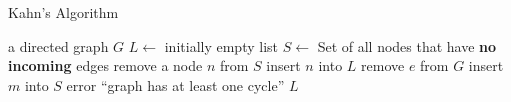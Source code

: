 \documentclass[a4paper]{article}
\begin{document}
\begin{algorithm}
  \caption{Kahn's Algorithm}\label{algo:kahn}
  \begin{algorithmic}
    \REQUIRE a directed graph $G$
    \STATE $L \leftarrow$ initially empty list
    \STATE $S \leftarrow$ Set of all nodes that have \textbf{no incoming} edges
      \STATE remove a node $n$ from $S$
      \STATE insert $n$ into $L$
        \STATE remove $e$ from $G$
          \STATE insert $m$ into $S$
        \ENDIF
      \ENDFOR
    \ENDWHILE
      \RETURN error ``graph has at least one cycle''
    \ENDIF
    \RETURN $L$
  \end{algorithmic}
\end{algorithm}
\end{document}
